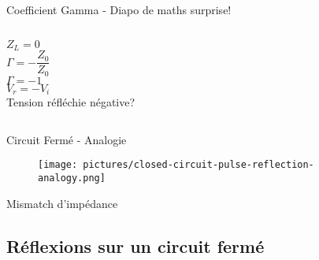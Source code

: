 \begin{frame}{Coefficient Gamma - Diapo de maths surprise!}
\begin{columns}
\begin{column}{0.33\textwidth}
            \begin{center}
                $Z_L = 0$\\
                \vspace{10pt}
                $\Gamma = -\dfrac{Z_0}{Z_0}$\\
                \vspace{10pt}
                $\Gamma = -1$\\
                \vspace{5pt}
                $V_r = -V_i$\\
                \vspace{5pt}
                Tension réfléchie négative?
            \end{center}
        \end{column}
    \end{columns}
\end{frame}


\begin{frame}{Circuit Fermé - Analogie}
    \begin{figure}
        \centering
        \texttt{[image: pictures/closed-circuit-pulse-reflection-analogy.png]}
    \end{figure}
\end{frame}

\begin{frame}{Mismatch d'impédance}
\end{frame}


\subsection{Réflexions sur un circuit fermé}

